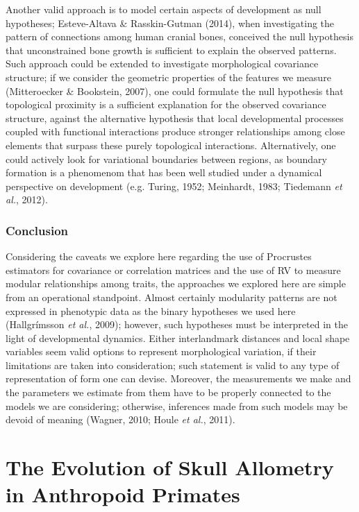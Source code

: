 \documentclass[12pt,twoside]{report}
\begin{document}
Another valid approach is to model certain aspects of development as
null hypotheses; Esteve-Altava \& Rasskin-Gutman (2014), when
investigating the pattern of connections among human cranial bones,
conceived the null hypothesis that unconstrained bone growth is
sufficient to explain the observed patterns. Such approach could be
extended to investigate morphological covariance structure; if we
consider the geometric properties of the features we measure
(Mitteroecker \& Bookstein, 2007), one could formulate the null
hypothesis that topological proximity is a sufficient explanation for
the observed covariance structure, against the alternative hypothesis
that local developmental processes coupled with functional interactions
produce stronger relationships among close elements that surpass these
purely topological interactions. Alternatively, one could actively look
for variational boundaries between regions, as boundary formation is a
phenomenom that has been well studied under a dynamical perspective on
development (e.g. Turing, 1952; Meinhardt, 1983; Tiedemann \emph{et
al.}, 2012).

\subsection{Conclusion}\label{conclusion}

Considering the caveats we explore here regarding the use of Procrustes
estimators for covariance or correlation matrices and the use of RV to
measure modular relationships among traits, the approaches we explored
here are simple from an operational standpoint. Almost certainly
modularity patterns are not expressed in phenotypic data as the binary
hypotheses we used here (Hallgrímsson \emph{et al.}, 2009); however,
such hypotheses must be interpreted in the light of developmental
dynamics. Either interlandmark distances and local shape variables seem
valid options to represent morphological variation, if their limitations
are taken into consideration; such statement is valid to any type of
representation of form one can devise. Moreover, the measurements we
make and the parameters we estimate from them have to be properly
connected to the models we are considering; otherwise, inferences made
from such models may be devoid of meaning (Wagner, 2010; Houle \emph{et
al.}, 2011).

\newpage
\chapter{The Evolution of Skull Allometry in Anthropoid Primates}
\label{ch:allo}
\end{document}
